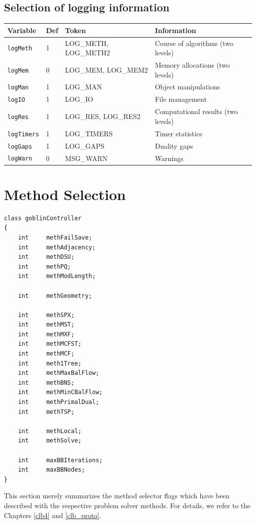 \documentclass[a4paper,11pt,twoside]{book}
\begin{document}
\begin{multicols}{2}
\subsection{Selection of logging information}
\label{slb_log_select}
\medskip
\begin{center}
\begin{tabular}{|p{1.7cm}|p{0.8cm}|p{2.5cm}|p{5.8cm}|}
\hline
{\bf Variable} & {\bf Def} & {\bf Token} & {\bf Information} \\
\hline
\hline
\verb/logMeth/  & 1 & LOG\_METH, LOG\_METH2 & Course of algorithms (two levels) \\
\verb/logMem/   & 0 & LOG\_MEM, LOG\_MEM2   & Memory allocations (two levels) \\
\verb/logMan/   & 1 & LOG\_MAN              & Object manipulations \\
\verb/logIO/    & 1 & LOG\_IO               & File management \\
\verb/logRes/   & 1 & LOG\_RES, LOG\_RES2   & Computational results (two levels) \\
\verb/logTimers/& 1 & LOG\_TIMERS           & Timer statistics \\
\verb/logGaps/  & 1 & LOG\_GAPS             & Duality gaps \\
\verb/logWarn/  & 0 & MSG\_WARN             & Warnings \\
\hline
\end{tabular}
\end{center}



\newpage
{}
\section{Method Selection}
\begin{mymethods}
\begin{verbatim}
class goblinController
{
    int     methFailSave;
    int     methAdjacency;
    int     methDSU;
    int     methPQ;
    int     methModLength;

    int     methGeometry;

    int     methSPX;
    int     methMST;
    int     methMXF;
    int     methMCFST;
    int     methMCF;
    int     meth1Tree;
    int     methMaxBalFlow;
    int     methBNS;
    int     methMinCBalFlow;
    int     methPrimalDual;
    int     methTSP;

    int     methLocal;
    int     methSolve;

    int     maxBBIterations;
    int     maxBBNodes;
}
\end{verbatim}
\end{mymethods}
This section merely summarizes the method selector flags which have been
described with the respective problem solver methods. For details, we refer to
the Chapters \ref{clb4} and \ref{clb_proto}.



\end{multicols}
\end{document}
